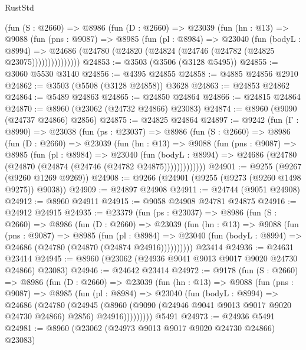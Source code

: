\begin{lexlean}{RustStd}
\begin{coremodule}
          (fun (S : @2660) =>
          @8986
            (fun (D : @2660) =>
            @23039
              (fun (hn : @13) =>
              @9088
                (fun (pns : @9087) =>
                @8985
                  (fun (pl : @8984) =>
                  @23040
                    (fun (bodyL : @8994) =>
                    @24686 (@24780 (@24820 (@24824 (@24746 (@24782 (@24825 @23075)))))))))))))))
@24853 := @3503 (@3506 (@3128 @5495))
@24855 := @3060 @5530 @3140
@24856 := @4395 @24855
@24858 := @4885 @24856 @2910
@24862 := @3503 (@5508 (@3128 @24858)) @3628
@24863 := @24853 @24862
@24864 := @5489 @24863
@24865 := @24850 @24864
@24866 := @24815 @24864
@24870 := @8960 (@23062 (@24732 @24866) @23083)
@24874 := @8960 (@9090 (@24737 @24866) @2856)
@24875 := @24825 @24864
@24897 := @9242
    (fun (Γ : @8990) =>
    @23038
      (fun (ps : @23037) =>
      @8986
        (fun (S : @2660) =>
        @8986
          (fun (D : @2660) =>
          @23039
            (fun (hn : @13) =>
            @9088
              (fun (pns : @9087) =>
              @8985
                (fun (pl : @8984) =>
                @23040
                  (fun (bodyL : @8994) =>
                  @24686 (@24780 (@24870 (@24874 (@24746 (@24782 @24875)))))))))))))
@24901 := @9255 (@9267 (@9260 @1269 @9269))
@24908 := @9266 (@24901 (@9255 (@9273 (@9260 @1498 @9275)) @9038))
@24909 := @24897 @24908
@24911 := @24744 (@9051 @24908)
@24912 := @8960 @24911
@24915 := @9058 @24908 @24781 @24875
@24916 := @24912 @24915
@24935 := @23379
    (fun (ps : @23037) =>
    @8986
      (fun (S : @2660) =>
      @8986
        (fun (D : @2660) =>
        @23039
          (fun (hn : @13) =>
          @9088
            (fun (pns : @9087) =>
            @8985
              (fun (pl : @8984) =>
              @23040 (fun (bodyL : @8994) => @24686 (@24780 (@24870 (@24874 @24916))))))))))
    @23414
@24936 := @24631 @23414
@24945 := @8960 (@23062 (@24936 @9041 @9013 @9017 @9020 @24730 @24866) @23083)
@24946 := @24642 @23414
@24972 := @9178
    (fun (S : @2660) =>
    @8986
      (fun (D : @2660) =>
      @23039
        (fun (hn : @13) =>
        @9088
          (fun (pns : @9087) =>
          @8985
            (fun (pl : @8984) =>
            @23040
              (fun (bodyL : @8994) =>
              @24686
                (@24780
                  (@24945
                    (@8960
                      (@9090 (@24946 @9041 @9013 @9017 @9020 @24730 @24866) @2856)
                      @24916)))))))))
    @5491
@24973 := @24936 @5491
@24981 := @8960 (@23062 (@24973 @9013 @9017 @9020 @24730 @24866) @23083)

\end{coremodule}
\end{lexlean}
